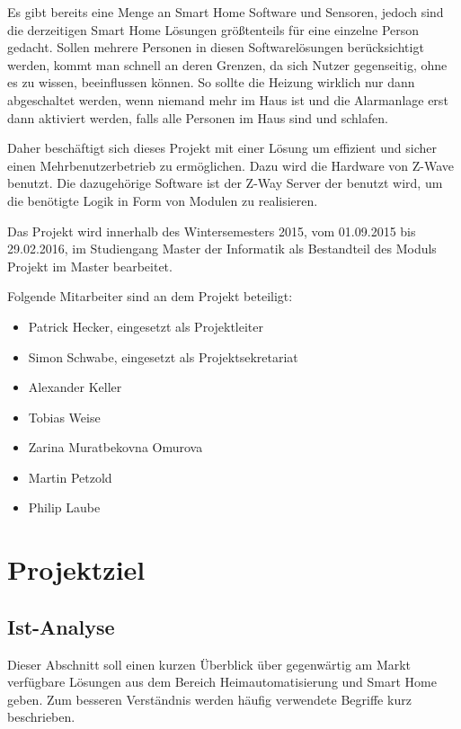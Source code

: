 \documentclass[12pt, oneside, smallheadings]{scrbook}
\begin{document}
Es gibt bereits eine Menge an Smart Home Software und Sensoren, jedoch sind die derzeitigen Smart Home Lösungen größtenteils für eine einzelne Person gedacht. Sollen mehrere Personen in diesen Softwarelösungen berücksichtigt werden, kommt man schnell an deren Grenzen, da sich Nutzer gegenseitig, ohne es zu wissen, beeinflussen können. So sollte die Heizung wirklich nur dann abgeschaltet werden, wenn niemand mehr im Haus ist und die Alarmanlage erst dann aktiviert werden, falls alle Personen im Haus sind und schlafen.

Daher beschäftigt sich dieses Projekt mit einer Lösung um effizient und sicher einen Mehrbenutzerbetrieb zu ermöglichen. Dazu wird die Hardware von Z-Wave benutzt. Die dazugehörige Software ist der Z-Way Server der benutzt wird, um die benötigte Logik in Form von Modulen zu realisieren.

Das Projekt wird innerhalb des Wintersemesters 2015, vom 01.09.2015 bis 29.02.2016, im Studiengang Master der Informatik als Bestandteil des Moduls \glqq Projekt im Master\grqq{} bearbeitet.

\newpage
\noindent
Folgende Mitarbeiter sind an dem Projekt beteiligt:\\
\begin{itemize}
	\item Patrick Hecker, eingesetzt als Projektleiter
	\item Simon Schwabe, eingesetzt als Projektsekretariat
	\item Alexander Keller
	\item Tobias Weise
	\item Zarina Muratbekovna Omurova
	\item Martin Petzold
	\item Philip Laube
\end{itemize}

\chapter{Projektziel}
\section{Ist-Analyse}
Dieser Abschnitt soll einen kurzen Überblick über gegenwärtig am Markt verfügbare Lösungen aus dem Bereich Heimautomatisierung und Smart Home geben. Zum besseren Verständnis werden häufig verwendete Begriffe kurz beschrieben.
\end{document}

